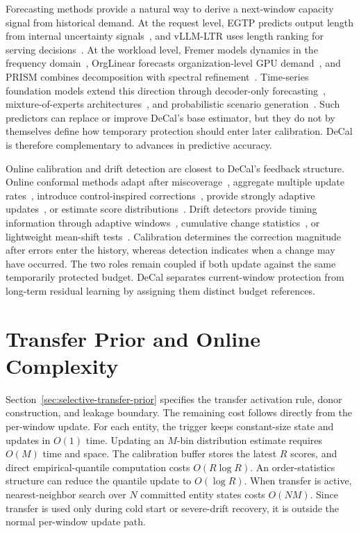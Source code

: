 \documentclass[sigplan,10pt, anonymous]{acmart}
\begin{document}
Forecasting methods provide a natural way to derive a next-window capacity signal from historical demand. At the request level, EGTP predicts output length from internal uncertainty signals~\cite{xie2026ICLR}, and vLLM-LTR uses length ranking for serving decisions~\cite{Fu2024NeurIPS}. At the workload level, Fremer models dynamics in the frequency domain~\cite{Ye2025}, OrgLinear forecasts organization-level GPU demand~\cite{Duan2026GFS}, and PRISM combines decomposition with spectral refinement~\cite{Wu2026PRISM}. Time-series foundation models extend this direction through decoder-only forecasting~\cite{Das2024ICML}, mixture-of-experts architectures~\cite{Shi2025ICLR}, and probabilistic scenario generation~\cite{dai2026from}. Such predictors can replace or improve DeCal's base estimator, but they do not by themselves define how temporary protection should enter later calibration. DeCal is therefore complementary to advances in predictive accuracy.

Online calibration and drift detection are closest to DeCal's feedback structure. Online conformal methods adapt after miscoverage~\cite{Gibbs2021}, aggregate multiple update rates~\cite{Zaffran2022}, introduce control-inspired corrections~\cite{Angelopoulos2023}, provide strongly adaptive updates~\cite{Gibbs2025JMLR}, or estimate score distributions~\cite{hu2026distributioninformed}. Drift detectors provide timing information through adaptive windows~\cite{bifet2007learning}, cumulative change statistics~\cite{page1954continuous}, or lightweight mean-shift tests~\cite{page1955test}. Calibration determines the correction magnitude after errors enter the history, whereas detection indicates when a change may have occurred. The two roles remain coupled if both update against the same temporarily protected budget. DeCal separates current-window protection from long-term residual learning by assigning them distinct budget references.

\section{Transfer Prior and Online Complexity}
\label{app:transfer_cost}

Section~\ref{sec:selective-transfer-prior} specifies the transfer activation rule, donor construction, and leakage boundary. The remaining cost follows directly from the per-window update. For each entity, the trigger keeps constant-size state and updates in $O(1)$ time. Updating an $M$-bin distribution estimate requires $O(M)$ time and space. The calibration buffer stores the latest $R$ scores, and direct empirical-quantile computation costs $O(R\log R)$. An order-statistics structure can reduce the quantile update to $O(\log R)$. When transfer is active, nearest-neighbor search over $N$ committed entity states costs $O(NM)$. Since transfer is used only during cold start or severe-drift recovery, it is outside the normal per-window update path.
\end{document}
